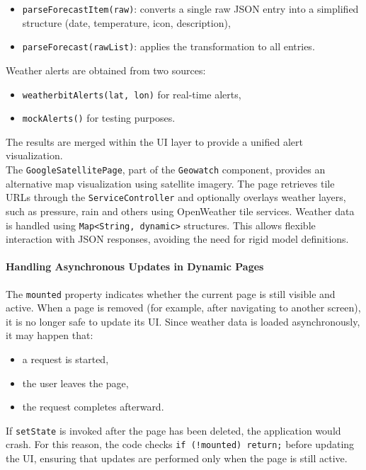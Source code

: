\begin{itemize}
    \item \texttt{parseForecastItem(raw)}: converts a single raw JSON entry into a simplified structure (date, temperature, icon, description),
    \item \texttt{parseForecast(rawList)}: applies the transformation to all entries.
\end{itemize}


Weather alerts are obtained from two sources:
\begin{itemize}
    \item \texttt{weatherbitAlerts(lat, lon)} for real-time alerts,
    \item \texttt{mockAlerts()} for testing purposes.
\end{itemize}

The results are merged within the UI layer to provide a unified alert visualization.\\
The \texttt{GoogleSatellitePage}, part of the \texttt{Geowatch} component, provides an alternative map visualization using satellite imagery. The page retrieves tile URLs through the \texttt{ServiceController} and optionally overlays weather layers, such as pressure, rain and others using OpenWeather tile services.
Weather data is handled using \texttt{Map<String, dynamic>} structures. This allows flexible interaction with JSON responses, avoiding the need for rigid model definitions.













\paragraph{Handling Asynchronous Updates in Dynamic Pages}
The \texttt{mounted} property indicates whether the current page is still visible and active.
When a page is removed (for example, after navigating to another screen), it is no longer safe to update its UI.
Since weather data is loaded asynchronously, it may happen that:
\begin{itemize}
    \item a request is started,
    \item the user leaves the page,
    \item the request completes afterward.
\end{itemize}
If \texttt{setState} is invoked after the page has been deleted, the application would crash.
For this reason, the code checks \texttt{if (!mounted) return;} before updating the UI,
ensuring that updates are performed only when the page is still active.
